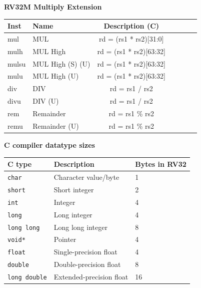 \begin{multicols}{2}
    
    \textbf{RV32M Multiply Extension}\\
    \begin{tabular}
        {|T | l | c | T | T | T | C } \hline
        \rm Inst & Name              & \rm Description (C)     \\ \hline
        mul      & MUL               & rd = (rs1 * rs2)[31:0]  \\
        mulh     & MUL High          & rd = (rs1 * rs2)[63:32] \\
        mulsu    & MUL High (S) (U)  & rd = (rs1 * rs2)[63:32] \\
        mulu     & MUL High (U)      & rd = (rs1 * rs2)[63:32] \\
        div      & DIV               & rd = rs1 / rs2          \\
        divu     & DIV (U)           & rd = rs1 / rs2          \\
        rem      & Remainder         & rd = rs1 \% rs2         \\
        remu     & Remainder (U)     & rd = rs1 \% rs2         \\
        \hline
    \end{tabular}

    \columnbreak

    \textbf{C compiler datatype sizes}\\
    \begin{tabular} {|l | l | l |} \hline
        C type              &  Description             & Bytes in RV32      \\ \hline
        \texttt{char}       & Character value/byte     & 1                  \\
        \texttt{short}      & Short integer            & 2                  \\
        \texttt{int}        & Integer                  & 4                  \\
        \texttt{long}       & Long integer             & 4                  \\
        \texttt{long long}  & Long long integer        & 8                  \\
        \texttt{void*}      & Pointer                  & 4                  \\
        \texttt{float}      & Single-precision float   & 4                  \\
        \texttt{double}     & Double-precision float   & 8                  \\
        \texttt{long double}& Extended-precision float & 16                 \\\hline
    \end{tabular}
\end{multicols}